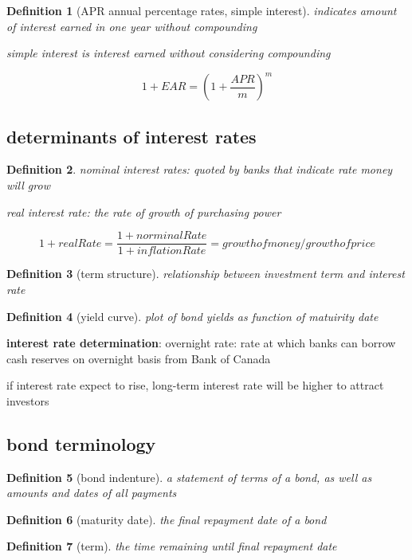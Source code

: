 \documentclass[10pt]{article}
\theoremstyle{break}
\newtheorem{defn}{Definition}[subsection]
\begin{document}
\begin{defn}[APR annual percentage rates, simple interest]
    indicates amount of interest earned in one year without compounding

    simple interest is interest earned without considering compounding
\end{defn}

$$1+EAR=(1+\frac{APR}{m})^m$$

\subsection{determinants of interest rates}
\begin{defn}
    nominal interest rates: quoted by banks that indicate rate money will grow

    real interest rate: the rate of growth of purchasing power
\end{defn}

$$1+realRate = \frac{1+norminalRate}{1+inflationRate} = growth of money / growth of price$$

\begin{defn}[term structure]
    relationship between investment term and interest rate
\end{defn}

\begin{defn}[yield curve]
    plot of bond yields as function of matuirity date
\end{defn}

\textbf{interest rate determination}: overnight rate: rate at which banks can borrow cash reserves on overnight basis from Bank of Canada

if interest rate expect to rise, long-term interest rate will be higher to attract investors

\subsection{bond terminology}
\begin{defn}[bond indenture]
    a statement of terms of a bond, as well as amounts and dates of all payments
\end{defn}

\begin{defn}[maturity date]
    the final repayment date of a bond
\end{defn}

\begin{defn}[term]
    the time remaining until final repayment date
\end{defn}
\end{document}
